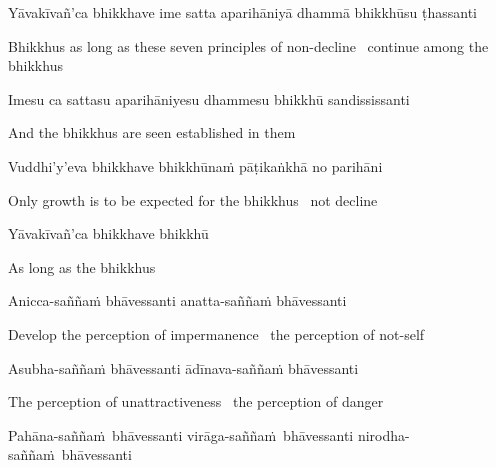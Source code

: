 \begin{pali-hang}
  Yāvakīvañ'ca bhikkhave ime satta aparihāniyā dhammā bhikkhūsu ṭhassanti
\end{pali-hang}

\begin{english-hang}
  Bhikkhus as long as these seven principles of non-decline \breathmark\ continue among the bhikkhus
\end{english-hang}

Imesu ca sattasu aparihāniyesu dhammesu bhikkhū sandississanti

\begin{english}
  And the bhikkhus are seen established in them
\end{english}

Vuddhi'y'eva bhikkhave bhikkhūnaṁ pāṭikaṅkhā no parihāni

\begin{english}
  Only growth is to be expected for the bhikkhus \breathmark\ not decline
\end{english}

\suttaRef{[AN 7.23]}

Yāvakīvañ'ca bhikkhave bhikkhū

\begin{english}
  As long as the bhikkhus
\end{english}

Anicca-saññaṁ bhāvessanti anatta-saññaṁ bhāvessanti

\begin{english}
  Develop the perception of impermanence \breathmark\ the perception of not-self
\end{english}

\ifninebythirteenversion\clearpage\fi

Asubha-saññaṁ bhāvessanti ādīnava-saññaṁ bhāvessanti

\begin{english}
  The perception of unattractiveness \breathmark\ the perception of danger
\end{english}

\begin{pali-hang}
  Pahāna-saññaṁ bhāvessanti virāga-saññaṁ bhāvessanti nirodha-saññaṁ bhāvessanti
\end{pali-hang}

